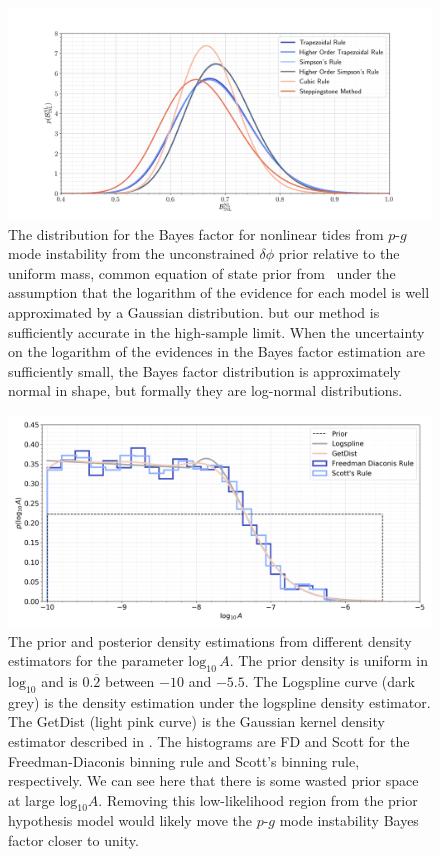 \begin{figure}
\centering
\includegraphics[width=1.0\textwidth]{figs/chapter6/multi_temper_bayes_lsc_sim_uni_ceos.png}
\caption{The distribution for the Bayes factor for nonlinear tides from $p$-$g$ mode instability from the unconstrained $\delta \phi$ prior relative to the uniform mass, common equation of state prior from~\cite{de2018tidal} under the assumption that the logarithm of the evidence for each model is well approximated by a Gaussian distribution.  but our method is sufficiently accurate in the high-sample limit. When the uncertainty on the logarithm of the evidences in the Bayes factor estimation are sufficiently small, the Bayes factor distribution is approximately normal in shape, but formally they are log-normal distributions.}
\label{fig:lvc_sim_uni_ceos_bayes_distr}
\end{figure}

\begin{figure}[th]
\centering
\includegraphics[width=1.0\textwidth]{figs/chapter6/prior_posterior_sddr.png}
\caption{The prior and posterior density estimations from different density estimators for the parameter $\mathrm{log}_{10} \, A$. The prior density is uniform in $\mathrm{log}_{10}$ and is $0.\overbar{2}$ between $-10$ and $-5.5$. The Logspline curve (dark grey) is the density estimation under the logspline density estimator. The GetDist (light pink curve) is the Gaussian kernel density estimator described in \cite{lewis2015getdist}. The histograms are FD and Scott for the Freedman-Diaconis binning rule and Scott's binning rule, respectively. We can see here that there is some wasted prior space at large $\mathrm{log}_{10} A$. Removing this low-likelihood region from the prior hypothesis model would likely move the $p$-$g$ mode instability Bayes factor closer to unity.}
\label{fig:density_estimators}
\end{figure}

